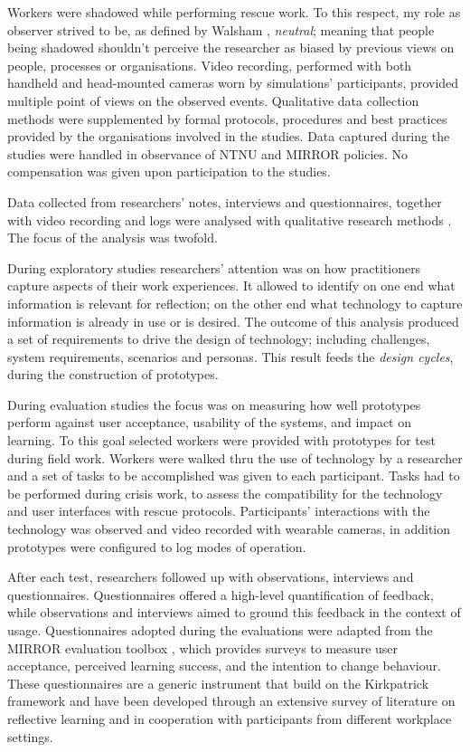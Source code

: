 Workers were shadowed while performing rescue work. To this respect, my
role as observer strived to be, as defined by Walsham
\autocite*{Walsham:2006bo}, \emph{neutral}; meaning that people being
shadowed shouldn't perceive the researcher as biased by previous views
on people, processes or organisations. Video recording, performed with
both handheld and head-mounted cameras worn by simulations'
participants, provided multiple point of views on the observed events.
Qualitative data collection methods were supplemented by formal
protocols, procedures and best practices provided by the organisations
involved in the studies. Data captured during the studies were handled
in observance of NTNU and MIRROR policies. No compensation was given
upon participation to the studies.

Data collected from researchers' notes, interviews and questionnaires,
together with video
recording
and logs were analysed with qualitative research methods
\autocite{robson1993real}. The focus of the analysis was twofold.

During exploratory studies researchers' attention was on how
practitioners capture aspects of their work experiences. It allowed to
identify on one end what information is relevant for reflection; on the
other end what technology to capture information is already in use or is
desired. The outcome of this analysis produced a set of requirements to
drive the design of technology; including challenges, system
requirements, scenarios and personas. This result feeds the \emph{design
cycles}, during the construction of prototypes.

During evaluation studies the focus was on measuring how well prototypes
perform against user acceptance, usability of the systems, and impact on
learning. To this goal selected workers were provided with prototypes
for test during field work. Workers were walked thru the use of
technology by a researcher and a set of tasks to be accomplished was
given to each participant. Tasks had to be performed during crisis work,
to assess the compatibility for the technology and user interfaces with
rescue protocols. Participants' interactions with the technology was
observed and video recorded with wearable cameras, in addition
prototypes were configured to log modes of operation.

After each test, researchers followed up with observations, interviews
and questionnaires. Questionnaires offered a high-level quantification
of feedback, while observations and interviews aimed to ground this
feedback in the context of usage. Questionnaires adopted during the
evaluations were adapted from the MIRROR evaluation toolbox
\autocite{Knipfer:2012vi}, which provides surveys to measure user
acceptance, perceived learning success, and the intention to change
behaviour. These questionnaires are a generic instrument that build on
the Kirkpatrick framework \autocite{kirkpatrick2009evaluating}
and have been developed through an extensive survey of literature on
reflective learning and in cooperation with participants from different
workplace settings.

